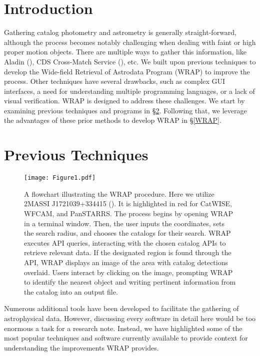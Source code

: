 \documentclass[twocolumn]{aastex631}
\begin{document}

\section{Introduction}\label{intro}
Gathering catalog photometry and astrometry is generally straight-forward, although the process becomes notably challenging when dealing with faint or high proper motion objects. There are multiple ways to gather this information, like Aladin (\citealt{Bonnarel et al.(2000)}), CDS Cross-Match Service (\citealt{Boch et al.(2012)}), etc. We built upon previous techniques to develop the Wide-field Retrieval of Astrodata Program (WRAP) to improve the process. Other techniques have several drawbacks, such as complex GUI interfaces, a need for understanding multiple programming languages, or a lack of visual verification. WRAP is designed to address these challenges. We start by examining previous techniques and programs in \S\ref{prev tech}. Following that, we leverage the advantages of these prior methods to develop WRAP in \S\ref{WRAP}.

\section{Previous Techniques} \label{prev tech}

\begin{figure*}[ht]
        \centering
        \texttt{[image: Figure1.pdf]}
        \caption{A flowchart illustrating the WRAP procedure. Here we utilize 2MASSI J1721039+334415 (\citealt{Bardalez Gagliuffi et al.(2014)}). It is highlighted in red for CatWISE, WFCAM, and PanSTARRS. The process begins by opening WRAP in a terminal window. Then, the user inputs the coordinates, sets the search radius, and chooses the catalogs for their search. WRAP executes API queries, interacting with the chosen catalog APIs to retrieve relevant data. If the designated region is found through the API, WRAP displays an image of the area with catalog detections overlaid. Users interact by clicking on the image, prompting WRAP to identify the nearest object and writing pertinent information from the catalog into an output file. }
        \label{Figure 1}
\end{figure*}

Numerous additional tools have been developed to facilitate the gathering of astrophysical data. However, discussing every software in detail here would be too enormous a task for a research note. Instead, we have highlighted some of the most popular techniques and software currently available to provide context for understanding the improvements WRAP provides.
\end{document}

